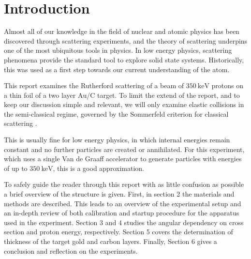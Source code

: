 \section{Introduction} 
Almost all of our knowledge in the field of nuclear and atomic physics has been discovered through scattering experiments, and the theory of scattering underpins one of the most ubiquitous tools in physics.
In low energy physics, scattering phenomena provide the standard tool to
explore solid state systems. Historically, this was used as a first step
towards our current understanding of the atom.

This report examines the Rutherford scattering of a beam of
$\SI{350}{\kilo\electronvolt}$ protons on a thin foil of
a two layer $\mathrm{Au}$/$\mathrm{C}$ target. To limit the extend of the report, and to
keep our discussion simple and relevant, we will only examine elastic
collisions in the semi-classical regime, governed by the Sommerfeld criterion
for classical scattering \parencite[p. 14]{noteBB}.

This is usually fine for low energy physics, in which internal energies remain
constant and no further particles are created or annihilated.
For this experiment, which uses a single Van de Graaff accelerator to generate
particles with energies of up to $\SI{350}{\kilo\electronvolt}$, this is a good
approximation.

To safely guide the reader through this report with as little confusion as
possible a brief overview of the structure is given.
First, in section 2 the materials and methods are described. This leads to an
overview of the experimental setup and an in-depth review of both calibration
and startup procedure for the apparatus used in the experiment. Section 3 and 4
studies the angular dependency on cross section and proton energy, respectively.
Section 5 covers the determination of thickness of the target gold and carbon
layers. Finally, Section 6 gives a conclusion and reflection on the experiments.

